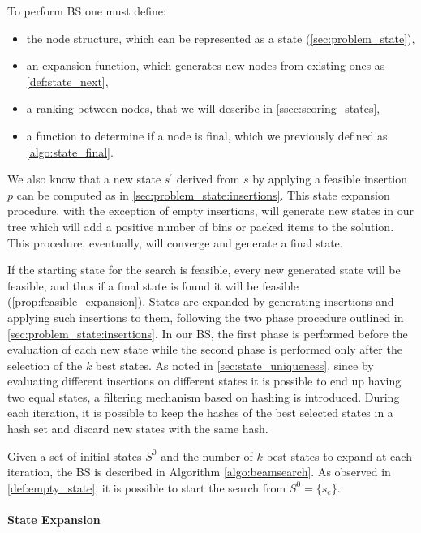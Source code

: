To perform BS one must define:
\begin{itemize}
    \item the node structure, which can be represented as a state (\cref{sec:problem_state}),
    \item an expansion function, which generates new nodes from existing ones as \cref{def:state_next},
    \item a ranking between nodes, that we will describe in \cref{ssec:scoring_states},
    \item a function to determine if a node is final, which we previously defined as \cref{algo:state_final}.
\end{itemize}

We also know that a new state $s^\prime$ derived from $s$ by applying a feasible insertion $p$ can be computed as in \cref{sec:problem_state:insertions}.
This state expansion procedure, with the exception of empty insertions, will generate new states in our tree which will add a positive number of bins or packed items to the solution. This procedure, eventually, will converge and generate a final state.

If the starting state for the search is feasible, every new generated state will be feasible, and thus if a final state is found it will be feasible (\cref{prop:feasible_expansion}).
States are expanded by generating insertions and applying such insertions to them, following the two phase procedure outlined in \cref{sec:problem_state:insertions}. In our BS, the first phase is performed before the evaluation of each new state while the second phase is performed only after the selection of the $k$ best states.
As noted in \cref{sec:state_uniqueness}, since by evaluating different insertions on different states it is possible to end up having two equal states, a filtering mechanism based on hashing is introduced.
During each iteration, it is possible to keep the hashes of the best selected states in a hash set and discard new states with the same hash.

Given a set of initial states $S^0$ and the number of $k$ best states to expand at each iteration, the BS is described in Algorithm \ref{algo:beamsearch}.
As observed in \cref{def:empty_state}, it is possible to start the search from $S^0 = \{ s_e \}$.



\paragraph*{State Expansion}

